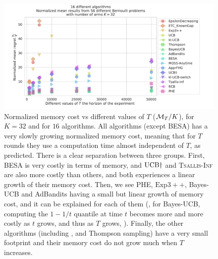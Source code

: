 \begin{figure}[h!]  %
	\includegraphics[width=1.10\linewidth]{16_different_algorithms__normmemory_vs_horizons__56pb__K32_7Ts.pdf}
	\caption[Normalized memory cost vs different values of $T$.]{
        Normalized memory cost vs different values of $T$ ($\mathcal{M}_T / K$),
        for $K=32$ and for $16$ algorithms.
        All algorithms (except BESA) has a very slowly growing normalized memory cost, meaning that for $T$ rounds they use a computation time almost independent of $T$, as predicted.
        There is a clear separation between three groups.
        First, BESA is very costly in terms of memory, and $\mathrm{UCB}\dagger$ and \textsc{Tsallis-Inf} are also more costly than others, and both experiences a linear growth of their memory cost.
        Then, we see PHE, $\mathrm{Exp}3++$, Bayes-UCB and AdBandits having a small but linear growth of memory cost, and it can be explained for each of them (\eg, for Bayes-UCB, computing the $1-1/t$ quantile at time $t$ becomes more and more costly as $t$ grows, and thus as $T$ grows,  ).
        Finally, the other algorithms (including \UCB, \klUCB{} and Thompson sampling) have a very small footprint and their memory cost do not grow much when $T$ increases.
	}
	\label{fig:3:16_different_algorithms__normmemory_vs_horizons__56pb__K32_7Ts}
\end{figure}


